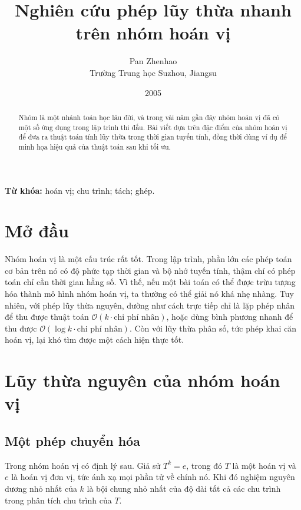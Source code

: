 \documentclass[11pt]{article}
\title{Nghiên cứu phép lũy thừa nhanh trên nhóm hoán vị}
\author{Pan Zhenhao\\Trường Trung học Suzhou, Jiangsu}
\date{2005}
\newcommand{\Oh}{\mathcal{O}}
\begin{document}
\maketitle


\renewcommand{\abstractname}{Tóm tắt}
\begin{abstract}
Nhóm là một nhánh toán học lâu đời, và trong vài năm gần đây nhóm hoán vị đã
có một số ứng dụng trong lập trình thi đấu. Bài viết dựa trên đặc điểm của
nhóm hoán vị để đưa ra thuật toán tính lũy thừa trong thời gian tuyến tính,
đồng thời dùng ví dụ để minh họa hiệu quả của thuật toán sau khi tối ưu.
\end{abstract}

\noindent\textbf{Từ khóa:} hoán vị; chu trình; tách; ghép.

\section{Mở đầu}

Nhóm hoán vị là một cấu trúc rất tốt. Trong lập trình, phần lớn các phép toán
cơ bản trên nó có độ phức tạp thời gian và bộ nhớ tuyến tính, thậm chí có phép
toán chỉ cần thời gian hằng số. Vì thế, nếu một bài toán có thể được trừu
tượng hóa thành mô hình nhóm hoán vị, ta thường có thể giải nó khá nhẹ nhàng.
Tuy nhiên, với phép lũy thừa nguyên, dường như cách trực tiếp chỉ là lặp phép
nhân để thu được thuật toán \(\Oh(k\cdot\text{chi phí nhân})\), hoặc dùng bình
phương nhanh để thu được \(\Oh(\log k\cdot\text{chi phí nhân})\). Còn với lũy
thừa phân số, tức phép khai căn hoán vị, lại khó tìm được một cách hiện thực
tốt.

\section{Lũy thừa nguyên của nhóm hoán vị}

\subsection{Một phép chuyển hóa}

Trong nhóm hoán vị có định lý sau. Giả sử \(T^k=e\), trong đó \(T\) là một
hoán vị và \(e\) là hoán vị đơn vị, tức ánh xạ mọi phần tử về chính nó. Khi
đó nghiệm nguyên dương nhỏ nhất của \(k\) là bội chung nhỏ nhất của độ dài tất
cả các chu trình trong phân tích chu trình của \(T\).
\end{document}
